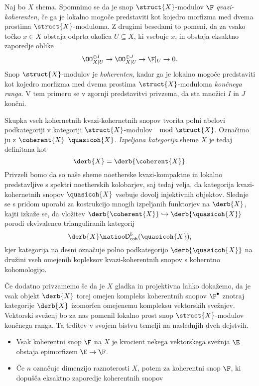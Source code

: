 Naj bo $X$ shema. Spomnimo se da je snop $\struct{X}$-modulov $\F$ \emph{qvazi-koherenten}, če ga je lokalno mogoče predstaviti kot kojedro morfizma med dvema prostima $\struct{X}$-moduloma. Z drugimi besedami to pomeni, da za vsako točko $x \in X$ obstaja odprta okolica $U \subseteq X$, ki vsebuje $x$, in obstaja eksaktno zaporedje oblike 
\[
    \OO_{X|U}^{\oplus I} \to \OO_{X|U}^{\oplus J} \to \F|_U \to 0.
\]
Snop $\struct{X}$-modulov je \emph{koherenten}, kadar ga je lokalno mogoče predstaviti kot kojedro morfizma med dvema prostima $\struct{X}$-moduloma \emph{končnega ranga}. V tem primeru se v zgornji predstavitvi privzema, da sta množici $I$ in $J$ končni.  

Skupka vseh kohernetnih \oz kvazi-kohernetnih snopov tvorita polni abelovi podkategoriji v kategoriji $\struct{X}$-modulov $\mod{\struct{X}}$. Označimo ju z $\coherent{X}$ \oz $\quasicoh{X}$. \emph{Izpeljana kategorija} sheme $X$ je tedaj definitana kot
\[
    \derb{X} = \derb{\coherent{X}}.
\]   
Privzeli bomo da so naše sheme noetherske \tj kvazi-kompaktne in lokalno predstavljive s spektri noetherskih kolobarjev, saj tedaj velja, da kategorija kvazi-kohernetnih snopov $\quasicoh{X}$ vsebuje dovolj injektivnih objektov. Slednje se s pridom uporabi za kostrukcijo mnogih izpeljanih funktorjev na $\derb{X}$, kajti izkaže se, da vložitev $\derb{\coherent{X}} \hookrightarrow \derb{\quasicoh{X}}$ porodi ekvivalenco trianguliranih kategorij 
\[
    \derb{X} \natiso \mathsf{D}^b_{\mathsf{coh}}(\quasicoh{X}),
\]
kjer kategorija na desni označuje polno podkategorijo $\derb{\quasicoh{X}}$ na družini vseh omejenih kopleksov kvazi-koherentnih snopov s koherntno kohomologijo. 

Če dodatno privzamemo še da je $X$ gladka in projektivna lahko dokažemo, da je vsak objekt $\derb{X}$ torej omejen kompleks koherentnih snopov $\F^\bullet$ znotraj kategorije $\derb{X}$ izomorfen omejenemu kompleksu vektorskih svežnjev. Vektorski sveženj bo za nas pomenil lokalno prost snop $\struct{X}$-modulov končnega ranga. Ta trditev v svojem bistvu temelji na naslednjih dveh dejstvih. 

\begin{itemize}[label = $\rhd$]
    \item Vsak koherentni snop $\F$ na $X$ je kvocient nekega vektorskega svežnja $\E$ \tj obstaja epimorfizem $\E \to \F$.
    \item Če $n$ označuje dimenzijo raznoterosti $X$, potem za koherentni snop $\F$, ki dopušča eksaktno zaporedje koherentnih snopov 
\end{itemize}


